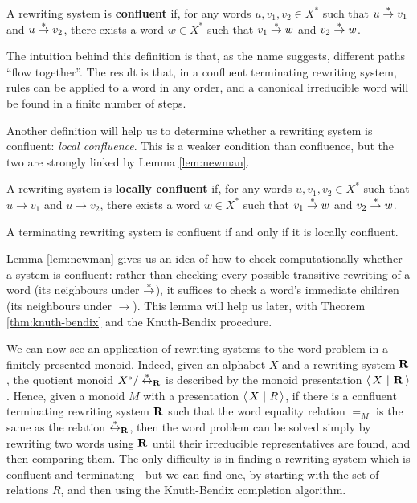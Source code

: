 \begin{definition}
  A rewriting system is \textbf{confluent} if, for any words $u,v_1,v_2 \in X^*$
  such that $u \stackrel{*}{\to} v_1$ and $u \stackrel{*}{\to} v_2$, there exists a word $w \in X^*$
  such that $v_1 \stackrel{*}{\to} w$ and $v_2 \stackrel{*}{\to} w$.
\end{definition}

The intuition behind this definition is that, as the name suggests, different
paths ``flow together''.  The result is that, in a confluent terminating
rewriting system, rules can be applied to a word in any order, and a canonical
irreducible word will be found in a finite number of steps.

Another definition will help us to determine whether a rewriting system is
confluent: \textit{local confluence}.  This is a weaker condition than
confluence, but the two are strongly linked by Lemma \ref{lem:newman}.


\begin{definition}
  A rewriting system is \textbf{locally confluent} if, for any words
  $u,v_1,v_2 \in X^*$ such that $u \to v_1$ and $u \to v_2$, there exists a word
  $w \in X^*$ such that $v_1 \stackrel{*}{\to} w$ and $v_2 \stackrel{*}{\to} w$.
\end{definition}

\begin{lemma} %
  \label{lem:newman}
  A terminating rewriting system is confluent if and only if it is locally
  confluent.
\end{lemma}

Lemma \ref{lem:newman} gives us an idea of how to check computationally whether
a system is confluent: rather than checking every possible transitive rewriting
of a word (its neighbours under $\stackrel{*}{\to}$), it suffices to check a word's
immediate children (its neighbours under $\to$).  This lemma will help us later,
with Theorem \ref{thm:knuth-bendix} and the Knuth-Bendix procedure.

We can now see an application of rewriting systems to the word problem in a
finitely presented monoid.  Indeed, given an alphabet $X$ and a rewriting system
$\mathbf{R}$, the quotient monoid $X^* / \stackrel{*}{\leftrightarrow}_{\mathbf{R}}$ is described by the
monoid presentation $\left\langle\,X ~\middle|~ \mathbf{R}\,\right\rangle$.  Hence, given a monoid $M$ with a
presentation $\left\langle\,X ~\middle|~ R\,\right\rangle$, if there is a confluent terminating rewriting system
$\mathbf{R}$ such that the word equality relation $=_M$ is the same as the
relation $\stackrel{*}{\leftrightarrow}_{\mathbf{R}}$, then the word problem can be solved
simply by rewriting two words using $\mathbf{R}$ until their irreducible
representatives are found, and then comparing them.  The only difficulty is in
finding a rewriting system which is confluent and terminating---but we can find
one, by starting with the set of relations $R$, and then using the Knuth-Bendix
completion algorithm.

